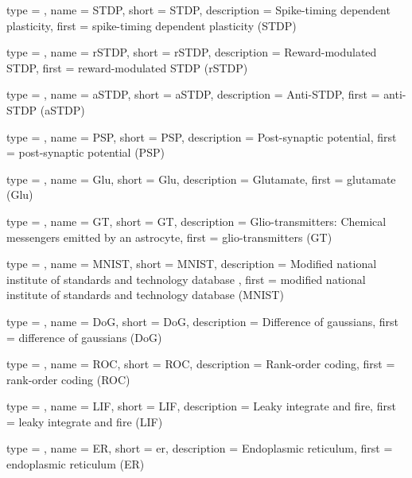 {
	type        = \acronymtype,
	name        = {STDP},
	short       = {STDP},
	description = {Spike-timing dependent plasticity},
	first       = {spike-timing dependent plasticity (STDP)}
}

{
	type        = \acronymtype,
	name        = {rSTDP},
	short       = {rSTDP},
	description = {Reward-modulated STDP},
	first       = {reward-modulated STDP (rSTDP)}
}

{
	type        = \acronymtype,
	name        = {aSTDP},
	short       = {aSTDP},
	description = {Anti-STDP},
	first       = {anti-STDP (aSTDP)}
}

{
	type        = \acronymtype,
	name        = {PSP},
	short       = {PSP},
	description = {Post-synaptic potential},
	first       = {post-synaptic potential (PSP)}
}

{
	type        = \acronymtype,
	name        = {Glu},
	short       = {Glu},
	description = {Glutamate},
	first       = {glutamate (Glu)}
}

{
	type        = \acronymtype,
	name        = {GT},
	short       = {GT},
	description = {Glio-transmitters: Chemical messengers emitted by an astrocyte},
	first       = {glio-transmitters (GT)}
}

{
	type        = \acronymtype,
	name        = {MNIST},
	short       = {MNIST},
	description = {Modified national institute of standards and technology database },   
	first       = {modified national institute of standards and technology database (MNIST)}
}

{
	type        = \acronymtype,
	name        = {DoG},
	short       = {DoG},
	description = {Difference of gaussians},
	first       = {difference of gaussians (DoG)}
}

{
	type        = \acronymtype,
	name        = {ROC},
	short       = {ROC},
	description = {Rank-order coding},
	first       = {rank-order coding (ROC)}
}

{
	type        = \acronymtype,
	name        = {LIF},
	short       = {LIF},
	description = {Leaky integrate and fire},
	first       = {leaky integrate and fire (LIF)}
}

{
	type        = \acronymtype,
	name        = {ER},
	short       = {er},
	description = {Endoplasmic reticulum},
	first       = {endoplasmic reticulum (ER)}
}

